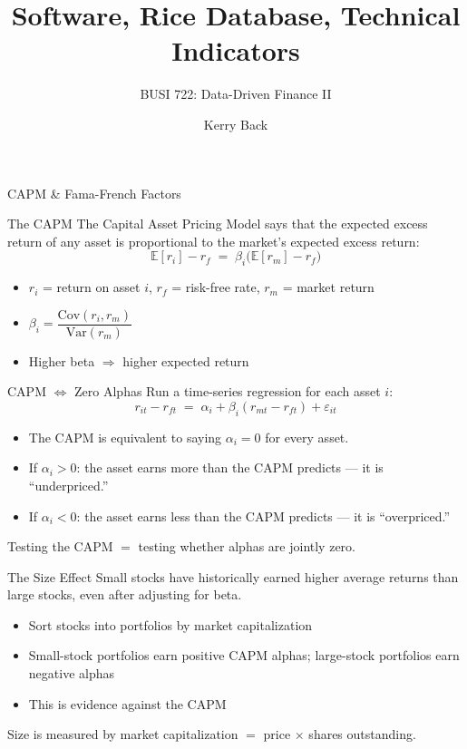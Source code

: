 \documentclass[aspectratio=169,t]{beamer}
\title{Software, Rice Database, Technical Indicators}
\subtitle{BUSI 722: Data-Driven Finance II}
\author{Kerry Back}
\institute{}
\date{}
\begin{document}
\maketitle


\begin{frame}[c]
\centering
\Huge CAPM \& Fama-French Factors
\end{frame}

\begin{frame}{The CAPM}
The Capital Asset Pricing Model says that the expected excess return of any asset is proportional to the market's expected excess return:
\[
\mathbb{E}[r_i] - r_f \;=\; \beta_i \bigl(\mathbb{E}[r_m] - r_f\bigr)
\]

\begin{itemize}
\item $r_i$ = return on asset $i$, \; $r_f$ = risk-free rate, \; $r_m$ = market return
\item $\beta_i = \dfrac{\text{Cov}(r_i, r_m)}{\text{Var}(r_m)}$
\item Higher beta $\Rightarrow$ higher expected return
\end{itemize}
\end{frame}

\begin{frame}{CAPM $\Leftrightarrow$ Zero Alphas}
Run a time-series regression for each asset $i$:
\[
r_{it} - r_{ft} \;=\; \alpha_i + \beta_i(r_{mt} - r_{ft}) + \varepsilon_{it}
\]

\begin{itemize}
\item The CAPM is equivalent to saying $\alpha_i = 0$ for every asset.
\item If $\alpha_i > 0$: the asset earns more than the CAPM predicts --- it is ``underpriced.''
\item If $\alpha_i < 0$: the asset earns less than the CAPM predicts --- it is ``overpriced.''
\end{itemize}

\vspace{0.3cm}
Testing the CAPM $=$ testing whether alphas are jointly zero.
\end{frame}

\begin{frame}{The Size Effect}
\alert{Small stocks have historically earned higher average returns than large stocks}, even after adjusting for beta.

\begin{itemize}
\item Sort stocks into portfolios by market capitalization
\item Small-stock portfolios earn positive CAPM alphas; large-stock portfolios earn negative alphas
\item This is evidence against the CAPM
\end{itemize}

\vspace{0.3cm}
Size is measured by market capitalization $=$ price $\times$ shares outstanding.
\end{frame}
\end{document}
